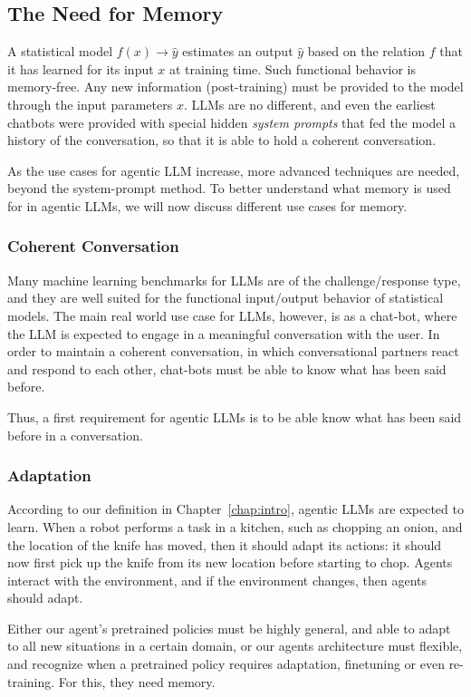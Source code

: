 \subsection{The Need for Memory}%
A statistical model $f(x) \rightarrow \hat{y}$ estimates an output $\hat{y}$ based on the relation $f$ that it has learned for its input $x$ at training time. Such functional behavior is memory-free. Any new  information (post-training) must be provided to the model through the input parameters $x$. LLMs are no different, and even the earliest chatbots were provided with special hidden {\em system prompts} that fed the model a history of the conversation, so that it is able to hold a coherent conversation. 

As the use cases for agentic LLM increase, more advanced techniques are needed, beyond the system-prompt method. 
To better understand what memory is used for in agentic LLMs, we will now discuss different use cases for memory.

\subsubsection{Coherent Conversation}
Many machine learning benchmarks for LLMs are of the challenge/response type, and they are well suited for the functional input/output behavior of statistical models. The main real world use case for LLMs, however, is as a chat-bot, where the LLM is expected to engage in a meaningful conversation with the user. In order to maintain a coherent conversation, in which conversational partners react and respond to each other, chat-bots must be able to know what has been said before.

Thus, a first requirement for agentic LLMs is to be able know what has been said before in a conversation. 



\subsubsection{Adaptation}
According to our definition in Chapter~\ref{chap:intro}, agentic LLMs are expected to learn. When a robot performs a task in a kitchen, such as chopping an onion, and the location of the knife  has moved, then it should adapt its actions: it should now first pick up the knife from its new location before starting to chop. Agents interact with the environment, and if the environment changes, then agents should adapt. 

Either our agent's pretrained policies must be highly general, and able to adapt to all new situations in a certain domain, or our agents architecture must flexible, and recognize when a pretrained policy requires adaptation, finetuning or even re-training. For this, they need memory.


